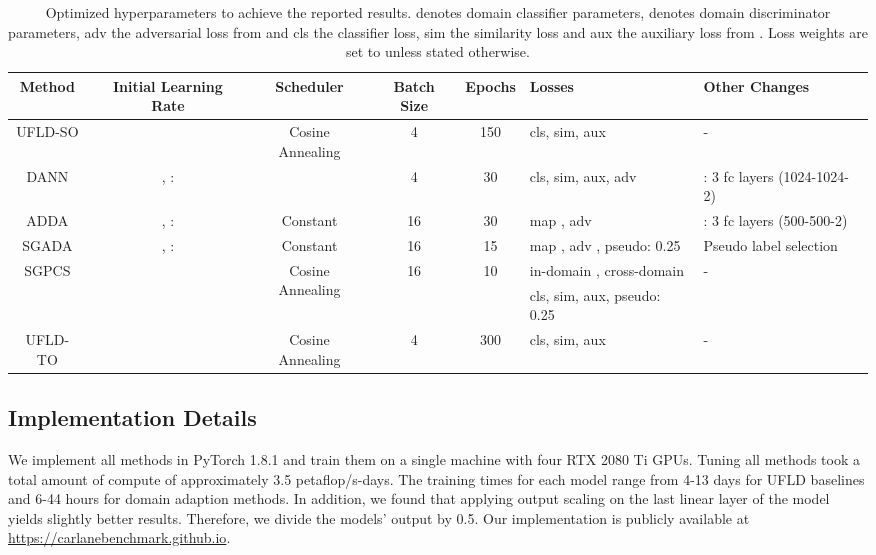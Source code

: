 \documentclass{article}
\begin{document}
	\begin{table}
		\caption{Optimized hyperparameters to achieve the reported results.  denotes domain classifier parameters,  denotes domain discriminator parameters, adv the adversarial loss from \cite{Tzeng2017ADDA} and cls the classifier loss, sim the similarity loss and aux the auxiliary loss from \cite{qin2020ultra}. Loss weights are set to  unless stated otherwise.}
		\label{table:Hyperpparameters}
		\tiny
		\centering
		\begin{tabular}{cccccll}
			\toprule
			Method  	& Initial Learning Rate    	             & Scheduler     & Batch Size  & Epochs    &Losses    & Other Changes \\   
			\midrule	
			UFLD-SO                &                 & Cosine Annealing           & 4           &150  & cls, sim, aux & - \\       
			DANN                   & , :    &    & 4  & 30 & cls, sim, aux, adv \cite{Ganin2016}  & : 3 fc layers (1024-1024-2)  \\   ADDA                    & , :   & Constant           & 16          & 30 & map \cite{Tzeng2017ADDA}, adv \cite{Tzeng2017ADDA}& : 3 fc layers (500-500-2) \\    SGADA                   & , :   & Constant           & 16          & 15 &  map \cite{Tzeng2017ADDA}, adv \cite{Tzeng2017ADDA}, pseudo: 0.25  & Pseudo label selection \\
			\multirow{2}{*}{SGPCS}  &\multirow{2}{*}{} & \multirow{2}{*}{Cosine Annealing} & \multirow{2}{*}{16} & \multirow{2}{*}{10} & in-domain \cite{yue2021prototypical}, cross-domain \cite{yue2021prototypical} & \multirow{2}{*}{-} \\
			&&&&& cls, sim, aux, pseudo: 0.25 & \\
			UFLD-TO                   &  & Cosine Annealing           & 4          & 300 & cls, sim, aux & - \\	   
			\bottomrule	
		\end{tabular}
	\end{table}
	
	\subsection{Implementation Details}
	\label{sec:ImplementationDetails}
We implement all methods in PyTorch 1.8.1 and train them on a single machine with four RTX 2080 Ti GPUs. Tuning all methods took a total amount of compute of approximately 3.5 petaflop/s-days. The training times for each model range from 4-13 days for UFLD baselines and 6-44 hours for domain adaption methods. In addition, we found that applying output scaling on the last linear layer of the model yields slightly better results. Therefore, we divide the models' output by 0.5. Our implementation is publicly available at \href{https://carlanebenchmark.github.io}{https://carlanebenchmark.github.io}.
	
\end{document}
